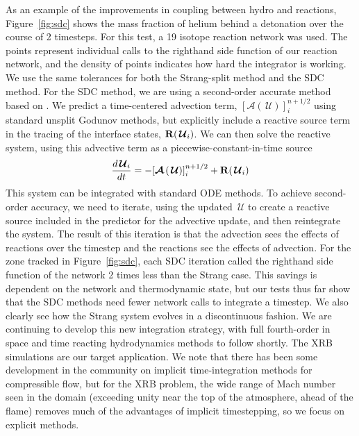 \documentclass[a4paper]{jpconf}
\newcommand{\Uc}{{\,\bm{\mathcal{U}}}}
\newcommand{\Adv}[1]{{\left [\boldsymbol{\mathcal{A}} \left(#1\right)\right]}}
\begin{document}
As an example of the improvements in coupling between hydro
and reactions, Figure~\ref{fig:sdc} shows the mass fraction of helium
behind a detonation over the course of 2 timesteps.  For this test,
a 19 isotope reaction network was used.  The points
represent individual calls to the righthand side function of our
reaction network, and the density of
points indicates how hard the integrator is working.  We use the same
tolerances for both the Strang-split method and the SDC method.  For
the SDC method, we are using a second-order accurate method based on
\cite{SDC-old}.  We predict a time-centered advection term,
$\Adv{\Uc}^{n+1/2}_i$ using standard unsplit Godunov methods, but
explicitly include a reactive source term in the tracing of the
interface states, ${\bf R}(\Uc_i)$.  We can then solve the reactive
system, using this advective term as a piecewise-constant-in-time
source
\begin{equation}
\label{eq:syst}
\frac{d{\Uc_i}}{dt} = -\Adv{\Uc}^{n+1/2}_i + {\bf R}(\Uc_i)
\end{equation}
This system can be integrated with standard ODE methods.  To achieve
second-order accuracy, we need to iterate, using the updated $\Uc$ to
create a reactive source included in the predictor for the advective
update, and then reintegrate the system.  The result of this iteration
is that the advection sees the effects of reactions over the timestep
and the reactions see the effects of advection.  For the zone tracked
in Figure~\ref{fig:sdc}, each SDC iteration called the righthand side
function of the network 2 times less than the Strang case.  This
savings is dependent on the network and thermodynamic state, but our
tests thus far show that the SDC methods need fewer network calls to
integrate a timestep.  We also clearly see how the Strang system
evolves in a discontinuous fashion.  We are continuing to develop this
new integration strategy, with full fourth-order in space and time
reacting hydrodynamics methods to follow shortly.  The XRB simulations
are our target application.  We note that there has been some
development in the community on implicit time-integration methods for
compressible flow, but for the XRB problem, the wide range of Mach
number seen in the domain (exceeding unity near the top of the
atmosphere, ahead of the flame) removes much of the advantages of
implicit timestepping, so we focus on explicit methods.
\end{document}
